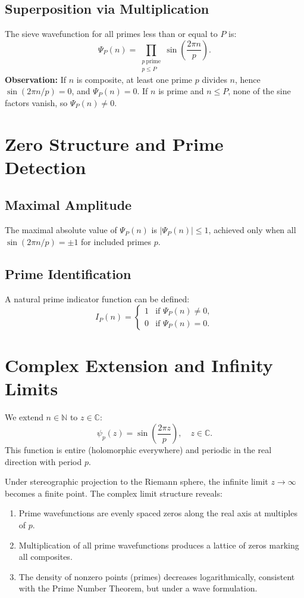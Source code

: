 \documentclass[12pt]{article}
\begin{document}
\subsection{Superposition via Multiplication}
The sieve wavefunction for all primes less than or equal to $P$ is:
\begin{equation}
\Psi_P(n) = \prod_{\substack{p \ \text{prime}\\p \le P}} \sin\left( \frac{2\pi n}{p} \right).
\end{equation}
\textbf{Observation:} If $n$ is composite, at least one prime $p$ divides $n$, hence $\sin(2\pi n / p) = 0$, and $\Psi_P(n) = 0$. If $n$ is prime and $n \le P$, none of the sine factors vanish, so $\Psi_P(n) \neq 0$.

\section{Zero Structure and Prime Detection}
\subsection{Maximal Amplitude}
The maximal absolute value of $\Psi_P(n)$ is $|\Psi_P(n)| \le 1$, achieved only when all $\sin(2\pi n / p) = \pm 1$ for included primes $p$.

\subsection{Prime Identification}
A natural prime indicator function can be defined:
\begin{equation}
I_P(n) = \begin{cases}
1 & \text{if } \Psi_P(n) \neq 0, \\
0 & \text{if } \Psi_P(n) = 0.
\end{cases}
\end{equation}

\section{Complex Extension and Infinity Limits}
We extend $n \in \mathbb{N}$ to $z \in \mathbb{C}$:
\begin{equation}
\psi_p(z) = \sin\left( \frac{2\pi z}{p} \right), \quad z \in \mathbb{C}.
\end{equation}
This function is entire (holomorphic everywhere) and periodic in the real direction with period $p$.

Under stereographic projection to the Riemann sphere, the infinite limit $z \to \infty$ becomes a finite point. The complex limit structure reveals:
\begin{enumerate}
    \item Prime wavefunctions are evenly spaced zeros along the real axis at multiples of $p$.
    \item Multiplication of all prime wavefunctions produces a lattice of zeros marking all composites.
    \item The density of nonzero points (primes) decreases logarithmically, consistent with the Prime Number Theorem, but under a wave formulation.
\end{enumerate}
\end{document}
